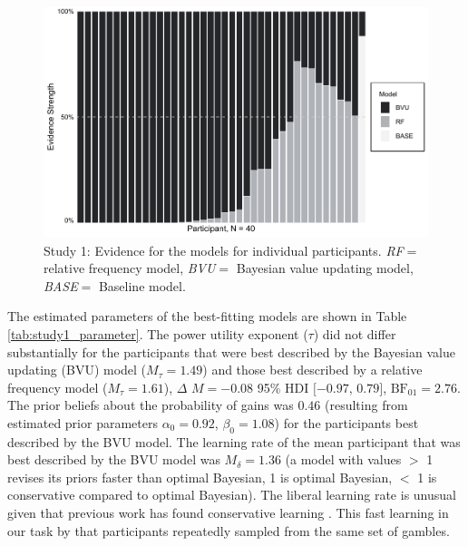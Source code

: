 \documentclass[
  a4paper, man, floatsintext]{apa6}
\begin{document}
\begin{figure}[htb]

{\centering \includegraphics[width=.9\linewidth]{../figures/fig2-1} 

}

\caption{Study 1: Evidence for the models for individual participants. \textit{RF}$=$ relative frequency model, \textit{BVU}$=$ Bayesian value updating model, \textit{BASE}$=$ Baseline model.}\label{fig:fig2}
\end{figure}

The estimated parameters of the best-fitting models are shown in Table
\ref{tab:study1_parameter}. The power utility exponent (\(\tau\)) did
not differ substantially for the participants that were best described
by the Bayesian value updating (BVU) model (\(M_{\tau}= 1.49\)) and
those best described by a relative frequency model (\(M_{\tau}=1.61\)),
\(\Delta\) \(M = -0.08\) 95\% HDI \([-0.97\), \(0.79]\),
\(\mathrm{BF}_{\textrm{01}} = 2.76\). The prior beliefs about the
probability of gains was \(0.46\) (resulting from estimated prior
parameters \(\alpha_0 = 0.92\), \(\beta_0 = 1.08\)) for the participants
best described by the BVU model. The learning rate of the mean
participant that was best described by the BVU model was
\(M_{\delta}=1.36\) (a model with values \(>\) 1 revises its priors
faster than optimal Bayesian, 1 is optimal Bayesian, \(<\) 1 is
conservative compared to optimal Bayesian). The liberal learning rate is
unusual given that previous work has found conservative learning
\citep{Edwards1967,Tauber2017}. This fast learning in our task
 by that participants repeatedly
sampled from the same set of gambles.
\end{document}
